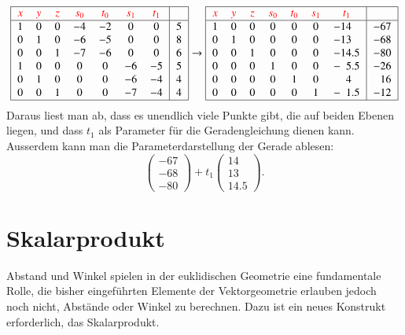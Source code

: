 \[
\begin{tabular}{|>{$}c<{$}>{$}c<{$}>{$}c<{$}>{$}c<{$}>{$}c<{$}>{$}c<{$}>{$}c<{$}|>{$}c<{$}|}
\hline
{\color{red}x}&
{\color{red}y}&
{\color{red}z}&
{\color{red}s_0}&
{\color{red}t_0}&
{\color{red}s_1}&
{\color{red}t_1}&\\
\hline
1&0&0&-4&-2& 0& 0&5\\
0&1&0&-6&-5& 0& 0&8\\
0&0&1&-7&-6& 0& 0&6\\
1&0&0& 0& 0&-6&-5&5\\
0&1&0& 0& 0&-6&-4&4\\
0&0&1& 0& 0&-7&-4&4\\
\hline
\end{tabular}
\rightarrow
\begin{tabular}{|>{$}c<{$}>{$}c<{$}>{$}c<{$}>{$}c<{$}>{$}c<{$}>{$}c<{$}>{$}c<{$}|>{$}c<{$}|}
\hline
{\color{red}x}&
{\color{red}y}&
{\color{red}z}&
{\color{red}s_0}&
{\color{red}t_0}&
{\color{red}s_1}&
{\color{red}t_1}&\\
\hline
1&0&0&0&0&0&         - 14\phantom{.0}&-67\\
0&1&0&0&0&0&         - 13\phantom{.0}&-68\\
0&0&1&0&0&0&         - 14.5          &-80\\
0&0&0&1&0&0&-\phantom{0}5.5          &-26\\
0&0&0&0&1&0&\phantom{-0}4\phantom{.0}&\phantom{-}16\\
0&0&0&0&0&1&-\phantom{0}1.5          &-12\\
\hline
\end{tabular}
\]
Daraus liest man ab, dass es unendlich viele Punkte gibt, die auf beiden
Ebenen liegen, und dass $t_1$ als Parameter für die Geradengleichung
dienen kann.
Ausserdem kann man die Parameterdarstellung der Gerade ablesen:
\[
\begin{pmatrix}-67\\-68\\-80\end{pmatrix}
+t_1
\begin{pmatrix}14\\13\\14.5\end{pmatrix}.
\]
\section{Skalarprodukt}
Abstand und Winkel spielen in der euklidischen Geometrie eine fundamentale
Rolle, die bisher eingeführten Elemente der Vektorgeometrie erlauben
jedoch noch nicht, Abstände oder Winkel zu berechnen.
Dazu ist ein neues Konstrukt erforderlich, das Skalarprodukt.

